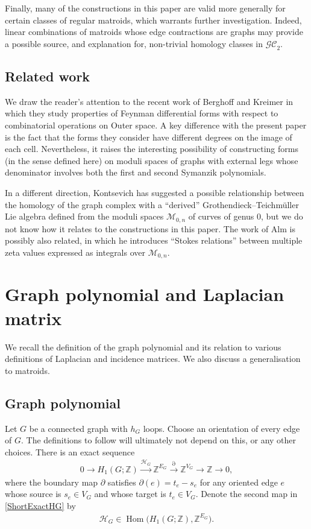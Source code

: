 \documentclass[pdftex]{sigma}%
\numberwithin{equation}{section}
\newcommand{\To}{\longrightarrow}
\newcommand{\Z}{\mathbb Z}
\newcommand{\GC}{\mathcal{GC}}
\newcommand{\0}{\color{blue}{\mathsf{0}}}
\begin{document}
Finally, many of the constructions in this paper are valid more generally for certain classes of regular matroids, which warrants further investigation. Indeed, linear combinations of matroids whose edge contractions are graphs may provide a possible source, and explanation for, non-trivial homology classes in $\GC_2$.

 \subsection{Related work} We draw the reader's attention to the recent work of Berghoff and Kreimer \cite{BerghoffKreimer} in which they study properties of Feynman differential forms with respect to combinatorial operations on Outer space. A key difference with the present paper is the fact that the forms they consider have different degrees on the image of each cell. Nevertheless, it raises the interesting possibility of constructing forms (in the sense defined here) on moduli spaces of graphs with external legs whose denominator involves both the first and second Symanzik polynomials.

In a different direction, Kontsevich has suggested a possible relationship between the homology of the graph complex with a ``derived'' Grothendieck--Teichm\"uller Lie algebra \cite{KontsevichBourbaki} defined from the moduli spaces $\mathcal{M}_{0,n}$ of curves of genus 0, but we do not know how it relates to the constructions in this paper.
The work of Alm \cite{Alm} is possibly also related, in which he introduces ``Stokes relations'' between multiple zeta values expressed as integrals over $\mathcal{M}_{0,n}$.
\section{Graph polynomial and Laplacian matrix}
We recall the definition of the graph polynomial and its relation to various definitions of Laplacian and incidence matrices. We also discuss a generalisation to matroids.

\subsection{Graph polynomial}
Let $G$ be a connected graph with $h_G$ loops.
Choose an orientation of every edge of $G$. The definitions to follow will ultimately not depend on this, or any other choices. There is an exact sequence
\begin{gather}\label{ShortExactHG} 0 \To H_1(G;\Z) \overset{\mathcal{H}_G}{\To} \Z^{E_G} \overset{\partial}{\To} \Z^{V_G}\To \Z \To 0,
\end{gather}
where the boundary map $\partial$ satisfies
$\partial(e) = t_e - s_e$
for any oriented edge $e$ whose source is $s_e \in V_G$ and whose target is $t_e \in V_G$. Denote the second map in \eqref{ShortExactHG} by
\begin{gather*}
\mathcal{H}_G \in \operatorname{Hom}\big(H_1(G;\Z), \Z^{E_G}\big) .
\end{gather*}
\end{document}
